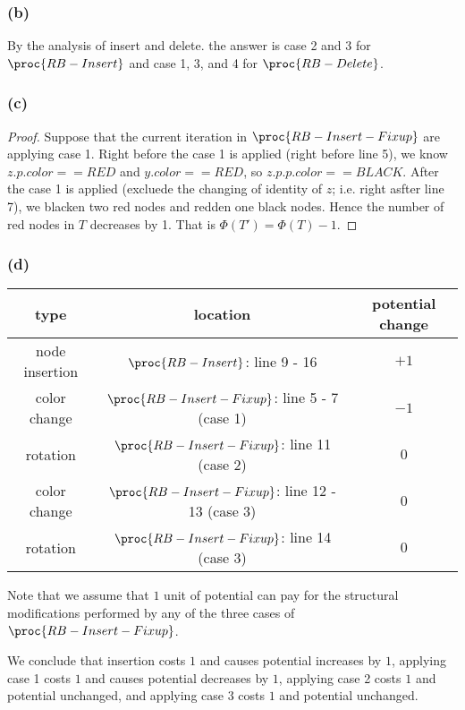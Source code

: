 \subsubsection*{(b)}

By the analysis of insert and delete.
the answer is case 2 and 3 for $\proc{RB-Insert}$
and case 1, 3, and 4 for $\proc{RB-Delete}$.

\subsubsection*{(c)}

\begin{proof}
    Suppose that the current iteration in $\proc{RB-Insert-Fixup}$ are applying case 1.
    Right before the case 1 is applied
    (right before line 5),
    we know $z.p.color == RED$ and $y.color == RED$,
    so $z.p.p.color == BLACK$.
    After the case 1 is applied 
    (excluede the changing of identity of $z$;
    i.e. right asfter line 7),
    we blacken two red nodes and redden one black nodes.
    Hence the number of red nodes in $T$ decreases by 1.
    That is $\Phi(T') = \Phi(T) - 1$.
\end{proof}

\subsubsection*{(d)}

\begin{tabular}{c|c|c}
    type & location & potential change \\ 
    \hline
    node insertion & $\proc{RB-Insert}$: line 9 - 16 & $+1$ \\
    color change & $\proc{RB-Insert-Fixup}$: line 5 - 7 (case 1) & $-1$ \\
    rotation & $\proc{RB-Insert-Fixup}$: line 11 (case 2) & $0$ \\
    color change & $\proc{RB-Insert-Fixup}$: line 12 - 13 (case 3) & $0$ \\
    rotation & $\proc{RB-Insert-Fixup}$: line 14 (case 3) & $0$ \\
\end{tabular}

Note that we assume that $1$ unit of potential can pay for
the structural modifications performed 
by any of the three cases of $\proc{RB-Insert-Fixup}$.

We conclude that insertion costs $1$ and causes potential increases by $1$,
applying case 1 costs $1$ and causes potential decreases by $1$,
applying case 2 costs $1$ and potential unchanged,
and applying case 3 costs $1$ and potential unchanged.

